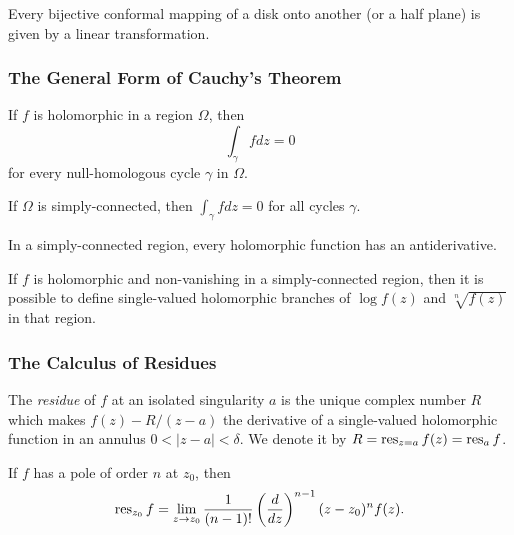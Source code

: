 \begin{corollary}
  Every bijective conformal mapping of a disk onto another (or a half plane) is given by a linear transformation.
\end{corollary}

\subsubsection{The General Form of Cauchy's Theorem}

\begin{theorem}
  If $f$ is holomorphic in a region $\Omega$, then
  \[
  \int_\gamma f d z = 0
  \]
  for every null-homologous cycle $\gamma$ in $\Omega$.
\end{theorem}

\begin{corollary}
  If $\Omega$ is simply-connected, then $\int_\gamma f d z = 0$ for all cycles $\gamma$.
\end{corollary}

\begin{corollary}
  In a simply-connected region, every holomorphic function has an antiderivative.
\end{corollary}

\begin{corollary}
  If $f$ is holomorphic and non-vanishing in a simply-connected region, then it is possible to define single-valued holomorphic branches of $\log f(z)$ and $\sqrt[n]{f(z)}$ in that region.
\end{corollary}

\subsubsection{The Calculus of Residues}

\begin{definition}
  The \emph{residue} of $f$ at an isolated singularity $a$ is the unique complex number $R$ which makes $f(z) - R/(z-a)$ the derivative of a single-valued holomorphic function in an annulus $0 < |z-a| < \delta$. We denote it by $R = \operatorname{res}_{z=a} f(z) = \operatorname{res}_a f$.
\end{definition}

\begin{theorem}
  If $f$ has a pole of order $n$ at $z_0$, then
  \[
  \operatorname{res}_{z_0} f = \lim_{z \rightarrow z_0} \frac{1}{(n-1)!} \left( \frac{d}{dz} \right)^{n-1} (z-z_0)^n f(z).
  \]
\end{theorem}

